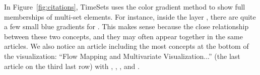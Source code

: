 In Figure~\ref{fig:citations}, TimeSets uses the color gradient method to show full memberships of multi-set elements. For instance, inside the \tsnetwork{} layer , there are quite a few small blue gradients for \tsgraph. This makes sense because the close relationship between these two concepts, and they may often appear together in the same articles. We also notice an article including the most concepts at the bottom of the visualization: ``Flow Mapping and Multivariate Visualization...'' (the last article on the third last row) with \tshierarchy, \tsinteraction, \tsgraph, \tsoverview{} and \tsnetwork.